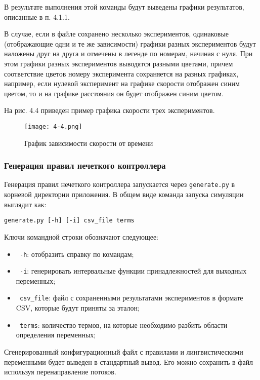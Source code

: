 В результате выполнения этой команды будут выведены графики результатов, описанные в п. 4.1.1.

В случае, если в файле сохранено несколько экспериментов, одинаковые (отображающие одни и те же зависимости) графики разных экспериментов будут наложены друг на друга и отмечены в легенде по номерам, начиная с  нуля. При этом графики разных экспериментов выводятся разными цветами, причем соответствие цветов номеру эксперимента сохраняется на разных графиках, например, если нулевой эксперимент на графике скорости отображен синим цветом, то и на графике расстояния он будет отображен синим цветом.

На рис. 4.4 приведен пример графика скорости трех экспериментов.

\begin{figure}[ht]
  \centering
  \texttt{[image: 4-4.png]}
  \caption{График зависимости скорости от времени }
\end{figure}

\subsubsection{ Генерация правил нечеткого контроллера }

Генерация правил нечеткого контроллера запускается через \lstinline!generate.py! в корневой директории приложения. В общем виде команда запуска симуляции выглядит как:

\begin{lstlisting}[style=pythonstyle,caption={  }, label=lst:func:1]
  generate.py [-h] [-i] csv_file terms
\end{lstlisting}

Ключи командной строки обозначают следующее:

\begin{itemize}
	\item \lstinline! -h!: отобразить справку по командам;
	\item \lstinline! -i!: генерировать интервальные функции принадлежностей для выходных переменных;
	\item \lstinline! csv_file!: файл с сохраненными результатами экспериментов в формате CSV, которые будут приняты за эталон;
	\item \lstinline! terms!: количество термов, на которые необходимо разбить области определения переменных;
\end{itemize}

Сгенерированный конфигурационный файл с правилами и лингвистическими переменными будет выведен в стандартный вывод. Его можно сохранить в файл используя перенаправление потоков.


